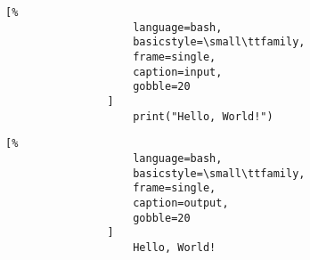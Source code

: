 \documentclass[crop=false,class=article,oneside]{standalone}
\begin{document}
            \begin{minipage}[t]{.48\textwidth}
                \centering
                \begin{lstlisting}[%
                    language=bash,
                    basicstyle=\small\ttfamily,
                    frame=single,
                    caption=input,
                    gobble=20
                ]
                    print("Hello, World!")
                \end{lstlisting}
            \end{minipage}
            \hfill
            \begin{minipage}[t]{.48\textwidth}
                \centering
                \begin{lstlisting}[%
                    language=bash,
                    basicstyle=\small\ttfamily,
                    frame=single,
                    caption=output,
                    gobble=20
                ]
                    Hello, World!
            \end{lstlisting}
            \end{minipage}
\end{document}
